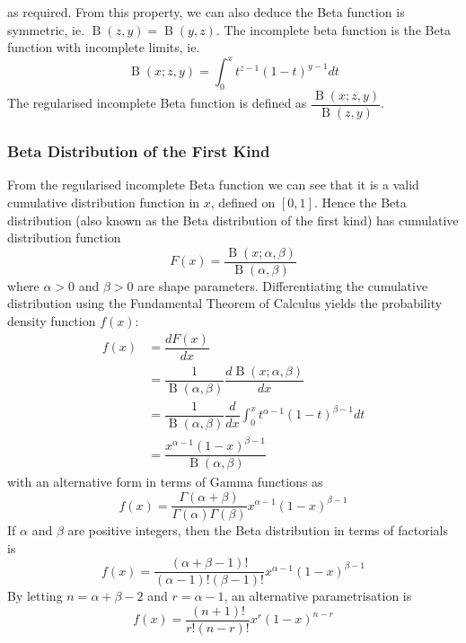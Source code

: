 \documentclass[11pt]{report} %
\begin{document}
as required. From this property, we can also deduce the Beta function is symmetric, ie. $\operatorname{B}\left(z, y\right) = \operatorname{B}\left(y, z\right)$. The incomplete beta function is the Beta function with incomplete  limits, ie.
\begin{equation}
\operatorname{B}\left(x; z, y\right) = \int_{0}^{x}t^{z - 1}\left(1 - t\right)^{y - 1}dt
\end{equation}
The regularised incomplete Beta function is defined as $\dfrac{\operatorname{B}\left(x; z, y\right)}{\operatorname{B}\left(z, y\right)}$.

\subsubsection{Beta Distribution of the First Kind}

From the regularised incomplete Beta function we can see that it is a valid cumulative distribution function in $x$, defined on $\left[0, 1\right]$. Hence the Beta distribution (also known as the Beta distribution of the first kind) has cumulative distribution function
\begin{equation}
F\left(x\right) = \dfrac{\operatorname{B}\left(x; \alpha, \beta\right)}{\operatorname{B}\left(\alpha, \beta\right)}
\end{equation}
where $\alpha > 0$ and $\beta > 0$ are shape parameters. Differentiating the cumulative distribution using the Fundamental Theorem of Calculus yields the probability density function $f\left(x\right)$:
\begin{align}
f\left(x\right) &= \dfrac{dF\left(x\right)}{dx} \\
&= \dfrac{1}{\operatorname{B}\left(\alpha, \beta\right)}\dfrac{d\operatorname{B}\left(x; \alpha, \beta\right)}{dx} \\
&= \dfrac{1}{\operatorname{B}\left(\alpha, \beta\right)}\dfrac{d}{dx}\int_{0}^{x}t^{\alpha - 1}\left(1-t\right)^{\beta - 1}dt \\
&= \dfrac{x^{\alpha - 1}\left(1-x\right)^{\beta - 1}}{\operatorname{B}\left(\alpha, \beta\right)}
\end{align}
with an alternative form in terms of Gamma functions as
\begin{equation}
f\left(x\right) = \dfrac{\Gamma\left(\alpha + \beta\right)}{\Gamma\left(\alpha\right)\Gamma\left(\beta\right)}x^{\alpha - 1}\left(1-x\right)^{\beta - 1}
\end{equation}
If $\alpha$ and $\beta$ are positive integers, then the Beta distribution in terms of factorials is
\begin{equation}
f\left(x\right) = \dfrac{\left(\alpha + \beta - 1\right)!}{\left(\alpha - 1\right)!\left(\beta - 1\right)!}x^{\alpha - 1}\left(1-x\right)^{\beta - 1}
\end{equation}
By letting $n = \alpha + \beta - 2$ and $r = \alpha - 1$, an alternative parametrisation is
\begin{equation}
f\left(x\right) = \dfrac{\left(n + 1\right)!}{r!\left(n - r\right)!}x^{r}\left(1-x\right)^{n - r}
\end{equation}
\end{document}
